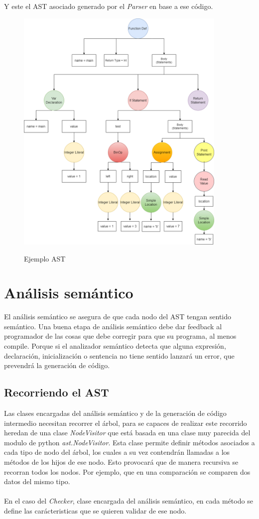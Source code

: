 \newpage Y este el AST asociado generado por el \textit{Parser} en base a ese código.
\begin{figure}[h]
    \centering
    \includegraphics[width=0.9\textwidth,keepaspectratio]{img/asttree_latexexample.png} 
    \parbox{\linewidth}{\centering Ejemplo AST}
    \label{fig:mi_imagen}
\end{figure}

\newpage
\section{Análisis semántico}
El análisis semántico se asegura de que cada nodo del AST tengan sentido semántico. Una buena etapa de análisis semántico debe dar feedback al programador de las cosas que debe corregir para que su programa, al menos compile. Porque si el analizador semántico detecta que alguna expresión, declaración, inicialización o sentencia no tiene sentido lanzará un error, que prevendrá la generación de código. 
\subsection{Recorriendo el AST}
Las clases encargadas del análisis semántico y de la generación de código intermedio necesitan recorrer el árbol, para se capaces de realizar este recorrido heredan de una clase \textit{NodeVisitor} que está basada en una clase muy parecida del modulo de python \textit{ast.NodeVisitor}. Esta clase permite definir métodos asociados a cada tipo de nodo del árbol, los cuales a su vez contendrán llamadas a los métodos de los hijos de ese nodo. Esto provocará que de manera recursiva se recorran todos los nodos. Por ejemplo, que en una comparación se comparen 
 dos datos del mismo tipo.\\\\
En el caso del \textit{Checker}, clase encargada del análisis semántico, en cada método se define las carácteristicas que se quieren validar de ese nodo. 
